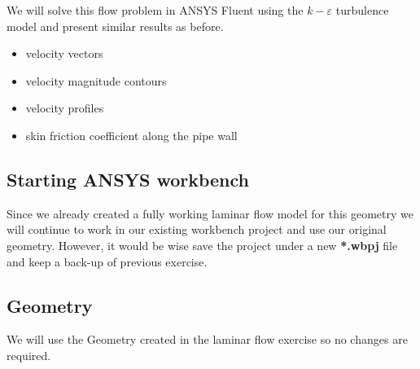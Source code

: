 \documentclass[11pt,a4paper,oneside]{scrartcl}
\newcommand\bfr[1]{\textcolor[rgb]{1,0.00,0.00}{\textbf{\textsf{#1}}}}
\begin{document}
We will solve this flow problem in ANSYS Fluent using the $k-\varepsilon$ turbulence model and present similar results as before.
\begin{itemize}
\item velocity vectors
\item velocity magnitude contours
\item velocity profiles
\item skin friction coefficient along the pipe wall
\end{itemize}


\subsection{Starting ANSYS workbench}

Since we already created a fully working laminar flow model for this geometry we will continue to work in our existing workbench project and use our original geometry. However, it would be wise save the project under a new \bfr{*.wbpj} file and keep a back-up of previous exercise.

\subsection{Geometry}

We will use the Geometry created in the laminar flow exercise so no changes are required.
\end{document}
